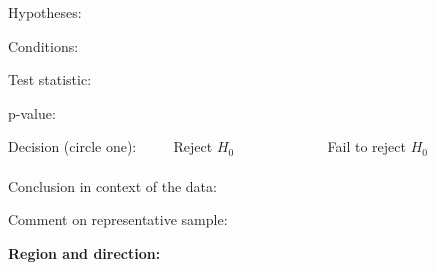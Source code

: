 \documentclass[11pt]{article}
\newcommand{\soln}[2]{$\:$\\ \vspace{#1}}{}
\begin{document}
Hypotheses:
\soln{1.5cm}{$H_0$: The sample distribution of regions follows the census distribution. \\
$H_A$: The sample distribution of regions does not follow the census distribution.}

Conditions:
\soln{4cm}{}

Test statistic:
\soln{3cm}{
$\chi^2 = \frac{(83 - 90)^2}{90} + \frac{(121 - 110)^2}{110} + \frac{(193 - 185)^2}{185} + \frac{(103 - 115)^2}{115} \approx 3.24$ \\
$df = 4 - 1 = 3$}

p-value:
\soln{1cm}{$p-value > 0.3$}

Decision (circle one):  $\qquad$ Reject $H_0$ $\qquad \qquad \qquad$ Fail to reject $H_0$ \\
$\:$ \\

Conclusion in context of the data:
\soln{2cm}{The data do not provide convincing evidence that the sample distribution of regions does not follow the 
census distribution.}

Comment on representative sample:
\soln{2cm}{The sample is likely representative since the distribution of sampled individual matches the distribution 
regional population distribution.}

%
\pagebreak

\textbf{Region and direction:} 
\end{document}
